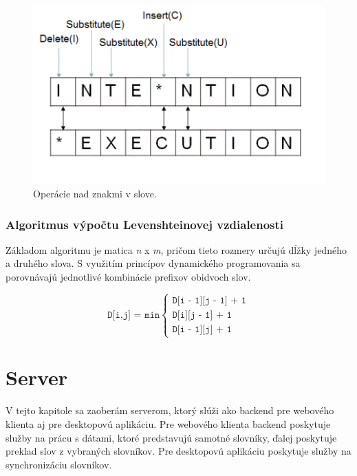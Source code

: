\documentclass[
  digital, %
  table,   %
  lof,     %
  lot,     %
]{fithesis3}
\begin{document}
\begin{figure}
	\begin{center}
	\includegraphics[width=\textwidth]{img/distance.png}
	\end{center}
    \caption{Operácie nad znakmi v slove.}
	\label{fig:levenshtein}
\end{figure}

\subsection{Algoritmus výpočtu Levenshteinovej vzdialenosti}
Základom algoritmu je matica \textit{n} x \textit{m}, pričom tieto rozmery určujú dĺžky jedného a druhého slova. S využitím princípov dynamického programovania sa porovnávajú jednotlivé kombinácie prefixov obidvoch slov.

 \begin{equation}
 \texttt{D[i,j] = min}\begin{cases}
       \texttt{D[i - 1][j - 1] + 1} \\
       \texttt{D[i][j - 1] + 1} \\
       \texttt{D[i - 1][j] + 1}
       \end{cases}
 \end{equation}


\chapter{Server}
V tejto kapitole sa zaoberám serverom, ktorý slúži ako backend pre webového klienta aj pre desktopovú aplikáciu. Pre webového klienta backend poskytuje služby na prácu s dátami, ktoré predstavujú samotné slovníky, ďalej poskytuje preklad slov z vybraných slovníkov. Pre desktopovú aplikáciu poskytuje služby na synchronizáciu slovníkov.
\end{document}
